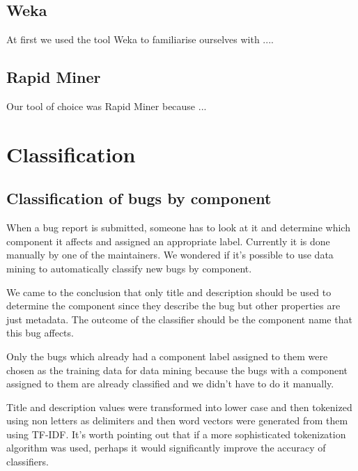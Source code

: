 \subsection{Weka} %
\label{sub:Weka}

At first we used the tool Weka to familiarise ourselves with ....


\subsection{Rapid Miner} %
\label{sub:Rapid Miner}

Our tool of choice was Rapid Miner because ...



\section{Classification} %
\label{sub:Classification}

\subsection{Classification of bugs by component} %
\label{sub:Classification of bugs bugs by component}

When a bug report is submitted, someone has to look at it and determine which component it affects and assigned an appropriate label. Currently it is done manually by one of the maintainers. We wondered if it's possible to use data mining to automatically classify new bugs by component.

We came to the conclusion that only title and description should be used to determine the component since they describe the bug but other properties are just metadata. The outcome of the classifier should be the component name that this bug affects.

Only the bugs which already had a component label assigned to them were chosen as the training data for data mining because the bugs with a component assigned to them are already classified and we didn't have to do it manually.

Title and description values were transformed into lower case and then tokenized using non letters as delimiters and then word vectors were generated from them using TF-IDF. It's worth pointing out that if a more sophisticated tokenization algorithm was used, perhaps it would significantly improve the accuracy of classifiers.

